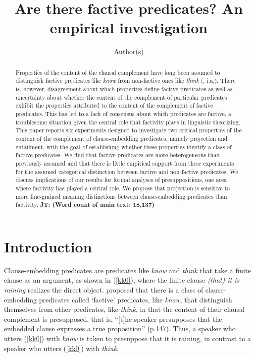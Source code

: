 \documentclass[11pt,fleqn]{article}
\title{Are there factive predicates? An empirical investigation}
\author{Author(s)}
\newcommand{\6}{\mbox{$[\hspace*{-.6mm}[$}}
\newcommand{\9}{\mbox{$]\hspace*{-.6mm}]$}}
\newcommand{\jt}[1]{\textbf{\color{blue}JT: #1}}
\begin{document}

\maketitle

\vspace*{-1cm}

\begin{abstract}

Properties of the content of the clausal complement have long been assumed to distinguish factive predicates like {\em know} from non-factive ones like {\em think} (\citealt{kiparsky-kiparsky70}, i.a.). There is, however, disagreement about which properties define factive predicates as well as uncertainty about whether the content of the complement of particular predicates exhibit the properties attributed to the content of the complement of factive predicates. This has led to a lack of consensus about which predicates are factive, a troublesome situation given the central role that factivity plays in linguistic theorizing. This paper reports six experiments designed to investigate two critical properties of the content of the complement of clause-embedding predicates, namely projection and entailment, with the goal of establishing whether these properties identify a class of factive predicates. We find that factive predicates are more heterogeneous than previously assumed and that there is little empirical support from these experiments for the assumed categorical distinction between factive and non-factive predicates. We discuss implications of our results for formal analyses of presuppositions, one area where factivity has played a central role. We propose that projection is sensitive to more fine-grained meaning distinctions between clause-embedding predicates than factivity. \jt{(Word count of main text: 18,137)}

\end{abstract}

		
\section{Introduction}\label{s1}

Clause-embedding predicates are predicates like {\em know} and {\em think} that take a finite clause as an argument, as shown in (\ref{kk0}), where the finite clause {\em (that) it is raining} realizes the direct object. \citealt{kiparsky-kiparsky70} proposed that there is a  class of clause-embedding predicates called `factive' predicates, like {\em know}, that distinguish themselves from other predicates, like {\em think}, in that the content of their clausal complement is presupposed, that is, ``[t]he speaker presupposes that the embedded clause expresses a true proposition'' (p.147). Thus, a speaker who utters (\ref{kk0}) with {\em know} is taken to presuppose that it is raining, in contrast to a speaker who utters (\ref{kk0}) with {\em think}.
\end{document}
